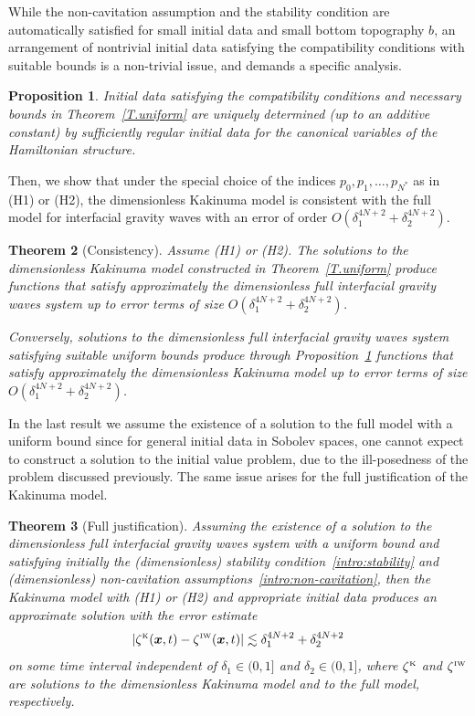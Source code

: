 \documentclass[11pt,leqno]{article}
\newtheorem{theorem}{\bf Theorem}[section]
\newtheorem{proposition}[theorem]{\bf Proposition}
\numberwithin{equation}{section}
\numberwithin{figure}{section}
\begin{document}
While the non-cavitation assumption and the stability condition are automatically satisfied for small initial data 
and small bottom topography $b$, an arrangement of nontrivial initial data satisfying the compatibility 
conditions with suitable bounds is a non-trivial issue, and demands a specific analysis. 


\begin{proposition}\label{P.compatibility}
	Initial data satisfying the compatibility conditions and necessary bounds in Theorem~\ref{T.uniform} are uniquely 
	determined (up to an additive constant) by sufficiently regular initial data for the canonical variables of the Hamiltonian structure.
\end{proposition}
Then, we show that under the special choice of the indices $p_0,p_1,\ldots,p_{N^*}$ as in (H1) or (H2), 
the dimensionless Kakinuma model is consistent with the full model for interfacial gravity waves with 
an error of order $O(\delta_1^{4N+2}+\delta_2^{4N+2})$.
\begin{theorem}[Consistency]\label{T.consistency}
	Assume (H1) or (H2).
	The solutions to the dimensionless Kakinuma model constructed in Theorem~\ref{T.uniform} produce functions that satisfy approximately 
	the dimensionless full interfacial gravity waves system up to error terms of size $O(\delta_1^{4N+2}+\delta_2^{4N+2})$. 
	
	Conversely, solutions to the dimensionless full interfacial gravity waves system satisfying suitable uniform bounds produce 
	through Proposition~\ref{P.compatibility} functions that satisfy approximately the dimensionless Kakinuma model 
	up to error terms of size $O(\delta_1^{4N+2}+\delta_2^{4N+2})$. 
\end{theorem}
In the last result we assume the existence of a solution to the full model with a uniform bound since 
for general initial data in Sobolev spaces, one cannot expect to construct a solution to the initial value problem,
due to the ill-posedness of the problem discussed previously. The same issue arises for the full justification of the Kakinuma model.
\begin{theorem}[Full justification]\label{T.justification}
	Assuming the existence of a solution to the dimensionless full interfacial gravity waves system with a uniform bound and satisfying initially
	the (dimensionless) stability condition~\eqref{intro:stability} and (dimensionless) non-cavitation assumptions~\eqref{intro:non-cavitation}, 
	then the Kakinuma model with (H1) or (H2) and appropriate initial data produces an approximate solution with the error estimate 
	\[
	|\zeta^{\mbox{\rm\tiny K}}(\bm{x},t)-\zeta^{\mbox{\rm\tiny IW}}(\bm{x},t)| \lesssim \delta_1^{4N+2}+\delta_2^{4N+2}
	\]
	on some time interval independent of $\delta_1\in(0,1]$ and $\delta_2\in(0,1]$, where $\zeta^{\mbox{\rm\tiny K}}$ and 
	$\zeta^{\mbox{\rm\tiny IW}}$ are solutions to the dimensionless Kakinuma model and to the full model, respectively. 
\end{theorem}
\end{document}
